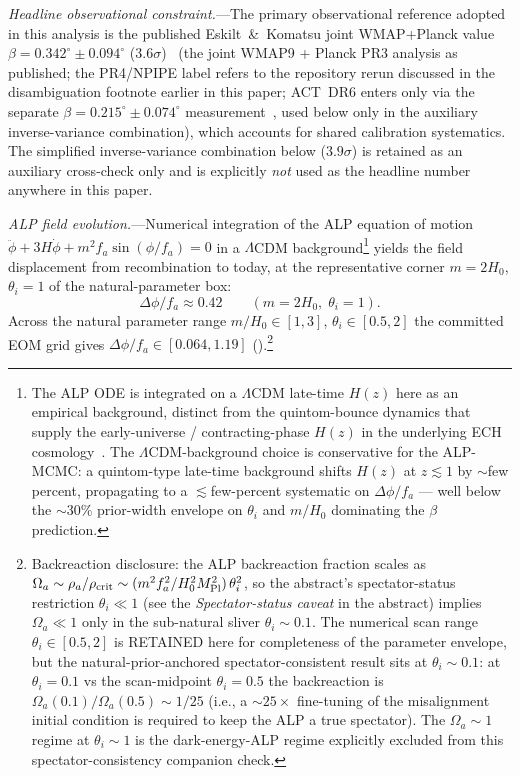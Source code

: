 \documentclass[aps,prd,twocolumn,superscriptaddress,showpacs,preprintnumbers,nofootinbib,longbibliography,floatfix]{revtex4-2}
\newcommand{\MPl}{M_{\rm Pl}}
\begin{document}
\textit{Headline observational constraint.}---The primary observational reference
adopted in this analysis is the published Eskilt~\&~Komatsu joint WMAP+Planck value
$\beta = 0.342^\circ\pm 0.094^\circ$ ($3.6\sigma$)~\cite{Eskilt2022} (the
joint WMAP9 + Planck PR3 analysis as published; the PR4/NPIPE label refers
to the repository rerun discussed in the disambiguation footnote earlier in
this paper; ACT~DR6 enters only via the separate
$\beta=0.215^\circ\pm 0.074^\circ$ measurement~\cite{DiegoPalazuelos2025}, used
below only in the auxiliary inverse-variance combination), which
accounts for shared calibration systematics. The simplified inverse-variance
combination below ($3.9\sigma$) is retained as an auxiliary cross-check only
and is explicitly \emph{not} used as the headline number anywhere in this paper.

\textit{ALP field evolution.}---Numerical integration of the ALP equation of
motion $\ddot\phi + 3H\dot\phi + m^2 f_a\sin(\phi/f_a) = 0$ in a $\Lambda$CDM
background\footnote{The ALP ODE is integrated on a $\Lambda$CDM late-time
$H(z)$ here as an empirical background, distinct from the quintom-bounce
dynamics that supply the early-universe / contracting-phase $H(z)$ in the
underlying ECH cosmology~\cite{Cai2010quintomReview}. The $\Lambda$CDM-background
choice is conservative for the ALP-MCMC: a quintom-type late-time
background shifts $H(z)$ at
$z\!\lesssim\!1$ by $\sim$few percent, propagating to a $\lesssim$few-percent
systematic on $\Delta\phi/f_a$ — well below the $\sim$30\% prior-width
envelope on $\theta_i$ and $m/H_0$ dominating the $\beta$ prediction.}
yields the field displacement from recombination to today, at the
representative corner $m = 2H_0$, $\theta_i = 1$ of the natural-parameter box:
\begin{equation}
\Delta\phi/f_a \approx 0.42 \qquad (m = 2H_0,\; \theta_i = 1).
\end{equation}
Across the natural parameter range $m/H_0\in[1,3]$, $\theta_i\in[0.5,2]$
the committed EOM grid gives
$\Delta\phi/f_a \in [0.064, 1.19]$
().\footnote{\label{fn:theta_backreaction}Backreaction
disclosure: the ALP backreaction fraction scales as $\Omega_a \sim
\rho_a/\rho_{\rm crit} \sim (m^2 f_a^2/H_0^2 \MPl^2)\,\theta_i^2$, so the
abstract's spectator-status restriction $\theta_i\ll 1$ (see the
\emph{Spectator-status caveat} in the abstract) implies $\Omega_a \ll 1$ only in the sub-natural sliver $\theta_i\sim 0.1$.
The numerical scan range $\theta_i\in[0.5,2]$ is RETAINED here for completeness
of the parameter envelope, but the natural-prior-anchored spectator-consistent
result sits at $\theta_i\sim 0.1$: at $\theta_i=0.1$ vs the scan-midpoint
$\theta_i=0.5$ the backreaction is $\Omega_a(0.1)/\Omega_a(0.5)\sim 1/25$
(i.e., a $\sim 25\times$ fine-tuning of the misalignment initial condition is
required to keep the ALP a true spectator). The $\Omega_a\sim 1$ regime at
$\theta_i\sim 1$ is the dark-energy-ALP regime explicitly excluded from this
spectator-consistency companion check.}
\end{document}

